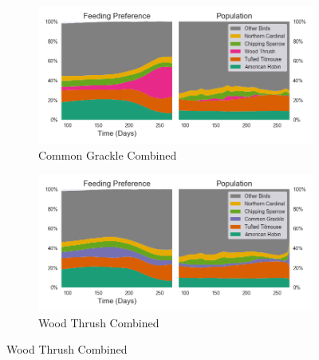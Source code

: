 \documentclass{beamer}
\begin{document}
\begin{frame}
\begin{figure}
\medskip
\begin{subfigure}{0.48\textwidth}
\includegraphics[width=\linewidth]{[2,6]_feedingindex.png}
\caption{Common Grackle Combined} \label{fig:c}
\end{subfigure}\hspace*{\fill}
\begin{subfigure}{0.48\textwidth}
\includegraphics[width=\linewidth]{[3,6]_feedingindex.png}
\caption{Wood Thrush Combined} \label{fig:c}
\end{subfigure}
\end{figure}
\end{frame}
\end{document}
